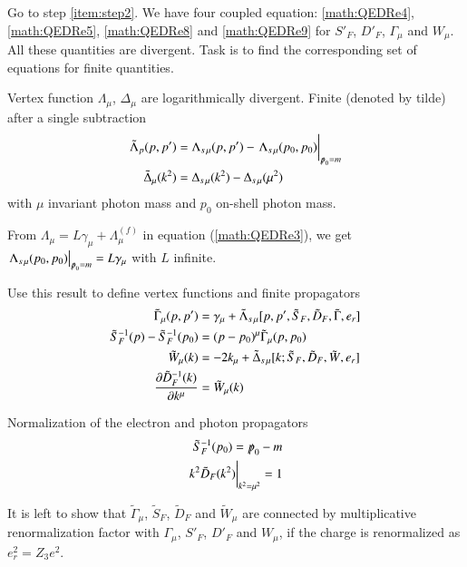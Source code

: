Go to step \ref{item:step2}. We have four coupled equation: \ref{math:QEDRe4}, \ref{math:QEDRe5}, \ref{math:QEDRe8} and \ref{math:QEDRe9} for $S'_F$, $D'_F$, $\Gamma_\mu$ and $W_\mu$. All these quantities are divergent. Task is to find the corresponding set of equations for finite quantities.

Vertex function $\Lambda_\mu$, $\Delta_\mu$ are logarithmically divergent. Finite (denoted by tilde) after a single subtraction
\begin{align}
   \begin{split}
      \tilde{\Lambda}_p (p,p') &= \Lambda_{s\, \mu}(p,p') - \eval{\Lambda_{s\,\mu}(p_0, p_0)}_{\slashed{p}_0 = m} \\
      \tilde{\Delta}_\mu (k^2) &= \Delta_{s \, \mu} (k^2) - \Delta_{s\, \mu}(\mu^2)
   \end{split} \label{math:QEDRe10}
\end{align}
with $\mu$ invariant photon mass and $p_0$ on-shell photon mass.

From $\Lambda_\mu = L \gamma_\mu + \Lambda_\mu^{(f)}$ in equation (\ref{math:QEDRe3}), we get $\eval{\Lambda_{s\, \mu}(p_0, p_0)}_{\slashed{p}_0 = m} = L \gamma_\mu$ with $L$ infinite.

Use this result to define vertex functions and finite propagators
\begin{align}
   \begin{split}
      \tilde{\Gamma}_\mu (p, p') &= \gamma_\mu + \tilde{\Lambda}_{s\,\mu} [p,p', \tilde{S}_F, \tilde{D}_F, \tilde{\Gamma}, e_r]  \\
      \tilde{S}_F^{-1}(p) - \tilde{S}_F^{-1}(p_0) &= (p-p_0)^\mu \tilde{\Gamma}_\mu (p, p_0) \\
      \tilde{W}_\mu (k) &= -2k_\mu + \tilde{\Delta}_{s\,\mu}[k; \tilde{S}_F, \tilde{D}_F, \tilde{W}, e_r] \\
      \pdv{\tilde{D}_F^{-1} (k)}{k^\mu} &= \tilde{W}_\mu(k)
   \end{split} \label{math:QEDRe11}
\end{align}

Normalization of the electron and photon propagators
\begin{align*}
   \tilde{S}_F^{-1}(p_0) = \slashed{p}_0 - m \\
   \eval{k^2 \tilde{D}_F(k^2) }_{k^2 = \mu^2} = 1
\end{align*}

It is left to show that $\tilde{\Gamma}_\mu$, $\tilde{S}_F$, $\tilde{D}_F$ and $\tilde{W}_\mu$ are connected by multiplicative renormalization factor with $\Gamma_\mu$, $S'_F$, $D'_F$ and $W_\mu$, if the charge is renormalized as $e_r^2 = Z_3 e^2$.

